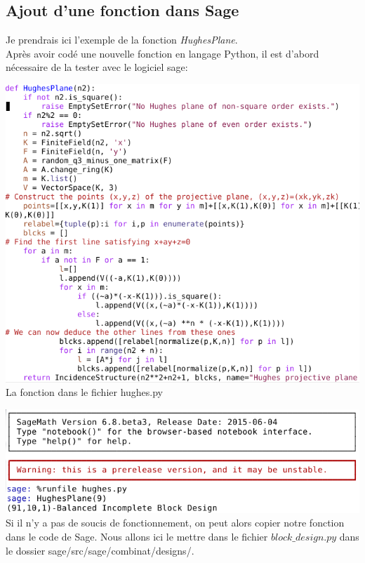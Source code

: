 \documentclass[a4paper]{article}
\begin{document}
\subsection{Ajout d'une fonction dans Sage}
Je prendrais ici l'exemple de la fonction \textit{HughesPlane}.\vspace{1\baselineskip}\\
Après avoir codé une nouvelle fonction en langage Python, il est d'abord nécessaire de la tester avec le logiciel sage:
\begin{center}
  \includegraphics[scale=0.7]{hughes.png}\\
  La fonction dans le fichier hughes.py
\end{center}
\vspace{1\baselineskip}
\includegraphics[scale=0.7]{hughessage.png}\vspace{1\baselineskip}\\
Si il n'y a pas de soucis de fonctionnement, on peut alors copier notre fonction dans le code de Sage. Nous allons ici le mettre dans le fichier $block\_design.py$ dans le dossier sage/src/sage/combinat/designs/.
\end{document}
